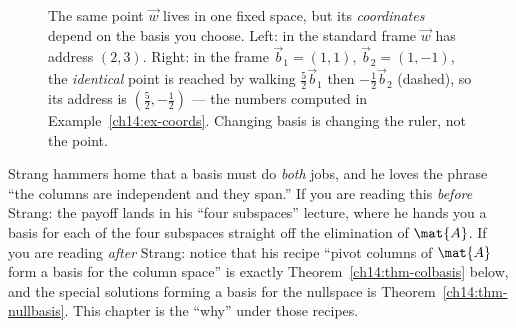 \begin{figure}[H]
\centering
{}
\caption{The same point $\vec{w}$ lives in one fixed space, but its
\emph{coordinates} depend on the basis you choose. Left: in the standard frame
$\vec{w}$ has address $(2,3)$. Right: in the frame $\vec{b}_1=(1,1)$,
$\vec{b}_2=(1,-1)$, the \emph{identical} point is reached by walking
$\tfrac52\vec{b}_1$ then $-\tfrac12\vec{b}_2$ (dashed), so its address is
$(\tfrac52,-\tfrac12)$ --- the numbers computed in Example~\ref{ch14:ex-coords}.
Changing basis is changing the ruler, not the point.}
\label{ch14:fig-frames}
\end{figure}

\begin{strangbox}
Strang hammers home that a basis must do \emph{both} jobs, and he loves the
phrase ``the columns are independent and they span.'' If you are reading this
\emph{before} Strang: the payoff lands in his ``four subspaces'' lecture, where
he hands you a basis for each of the four subspaces straight off the elimination
of $\mat{A}$. If you are reading \emph{after} Strang: notice that his recipe
``pivot columns of $\mat{A}$ form a basis for the column space'' is exactly
Theorem~\ref{ch14:thm-colbasis} below, and the special solutions forming a basis
for the nullspace is Theorem~\ref{ch14:thm-nullbasis}. This chapter is the
``why'' under those recipes.
\end{strangbox}

